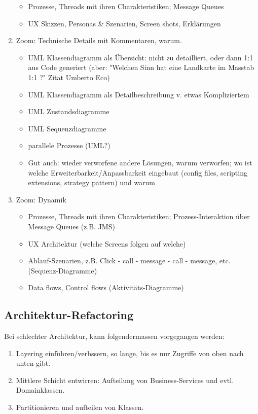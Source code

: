 \begin{enumerate}
\begin{itemize}
			\item Prozesse, Threads mit ihren Charakteristiken; Message Queues
			\item UX Skizzen, Personas \& Szenarien, Screen shots, Erklärungen
		\end{itemize}
	\item Zoom: Technische Details mit Kommentaren, warum.
		\begin{itemize}
			\item UML Klassendiagramm als Übersicht: nicht zu detailliert, oder dann 1:1			aus Code generiert (aber: "Welchen Sinn hat eine Landkarte im Masstab 1:1 ?" Zitat Umberto Eco)
			\item UML Klassendiagramm als Detailbeschreibung v. etwas Kompliziertem
			\item UML Zustandsdiagramme
			\item UML Sequenzdiagramme
			\item parallele Prozesse (UML?)
			\item Gut auch: wieder verworfene andere Lösungen, warum verworfen; wo ist welche Erweiterbarkeit/Anpassbarkeit eingebaut (config files, scripting extensions, strategy pattern) und warum
		\end{itemize}
	\item Zoom: Dynamik
		\begin{itemize}
			\item Prozesse, Threads mit ihren Charakteristiken; Prozess-Interaktion über Message Queues (z.B. JMS)
			\item UX Architektur (welche Screens folgen auf welche)
			\item Ablauf-Szenarien, z.B. Click - call - message - call - message, etc. (Sequenz-Diagramme)
			\item Data flows, Control flows (Aktivitäts-Diagramme)
		\end{itemize}
\end{enumerate}


\subsection{Architektur-Refactoring}

Bei schlechter Architektur, kann folgendermassen vorgegangen werden:

\begin{enumerate}
	\item Layering einführen/verbssern, so lange, bis es nur Zugriffe von oben nach unten gibt.
	\item Mittlere Schicht entwirren: Aufteilung von Business-Services und evtl. Domainklassen.
	\item Partitionieren und aufteilen von Klassen.
\end{enumerate}


